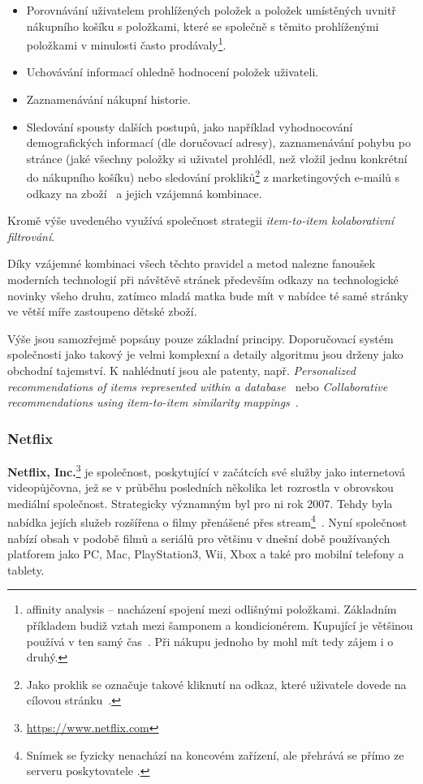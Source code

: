 \documentclass[thesis=M,czech]{FITthesis}[2014/05/07]
\begin{document}
\begin{itemize}
	\item Porovnávání uživatelem prohlížených položek a položek umístěných uvnitř nákupního košíku s položkami, které se společně s těmito prohlíženými položkami v minulosti často prodávaly\footnote{affinity analysis – nacházení spojení mezi odlišnými položkami. Základním příkladem budiž vztah mezi šamponem a kondicionérem. Kupující je většinou používá v ten samý čas~\cite{affinity}. Při nákupu jednoho by mohl mít tedy zájem i o druhý.}.
	\item Uchovávání informací ohledně hodnocení položek uživateli.
	\item Zaznamenávání nákupní historie.
	\item Sledování spousty dalších postupů, jako například vyhodnocování demografických informací (dle doručovací adresy), zaznamenávání pohybu po stránce (jaké všechny položky si uživatel prohlédl, než vložil jednu konkrétní do nákupního košíku) nebo sledování prokliků\footnote{Jako proklik se označuje takové kliknutí na odkaz, které uživatele dovede na cílovou stránku~\cite{proklik}.} z marketingových e-mailů s odkazy na zboží~\cite{amazonrec} a jejich vzájemná kombinace.
\end{itemize}

Kromě výše uvedeného využívá společnost strategii \emph{item-to-item kolaborativní filtrování}.

Díky vzájemné kombinaci všech těchto pravidel a metod nalezne fanoušek moderních technologií při návštěvě stránek především odkazy na technologické novinky všeho druhu, zatímco mladá matka bude mít v nabídce té samé stránky ve větší míře zastoupeno dětské zboží.
 
Výše jsou samozřejmě popsány pouze základní principy. Doporučovací systém společnosti jako takový je velmi komplexní a detaily algoritmu jsou drženy jako obchodní tajemství. K nahlédnutí jsou ale patenty, např. \emph{Personalized recommendations of items represented within a database}~\cite{jacobi2006personalized} nebo \emph{Collaborative recommendations using item-to-item similarity mappings}~\cite{linden2001collaborative}.

\subsubsection{Netflix}

\textbf{Netflix, Inc.}\footnote{\url{https://www.netflix.com}} je společnost, poskytující v začátcích své služby jako internetová videopůjčovna, jež se v průběhu posledních několika let rozrostla v obrovskou mediální společnost. Strategicky významným byl pro ni rok 2007. Tehdy byla nabídka jejích služeb rozšířena o filmy přenášené přes stream\footnote{Snímek se fyzicky nenachází na koncovém zařízení, ale přehrává se přímo ze serveru poskytovatele .}~\cite{netflix2007}. Nyní společnost nabízí obsah v podobě filmů a seriálů pro většinu v dnešní době používaných platforem jako PC, Mac, PlayStation3, Wii, Xbox a také pro mobilní telefony a tablety. 
\end{document}
